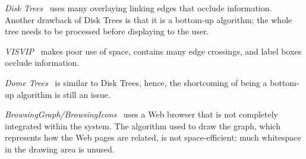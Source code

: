 \documentclass[10pt,psfig]{article}
\begin{document}
{%
{\em Disk Trees}~\cite{cpmpg-98} uses many overlaying linking edges that occlude information.
Another drawback of Disk Trees is that it is a bottom-up algorithm;  the whole tree needs to be processed before displaying to the user.

{\em VISVIP}~\cite{cs-99} makes poor use of space, contains many edge crossings, and label boxes occlude information. 

{\em Dome Trees}~\cite{cpp-00} is similar to Disk Trees, hence, the shortcoming of being a bottom-up algorithm is still an issue.

{\em BrowsingGraph/BrowsingIcons}~\cite{m-00} uses a Web browser that is not completely integrated within the system.
The algorithm used to draw the graph, which represents how the Web pages are related, is not space-efficient; much whitespace in the drawing area is unused.

}
\end{document}
